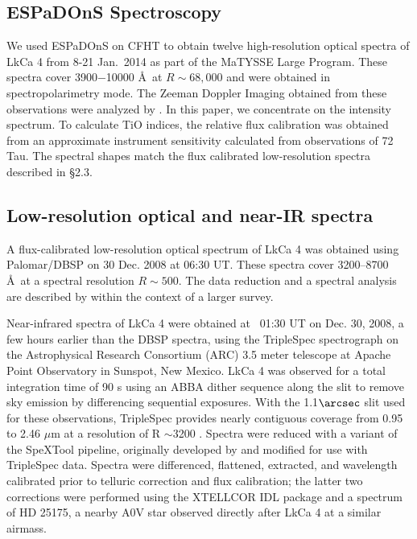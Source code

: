 \documentclass[twocolumn]{emulateapj}%
\newcommand{\name}{LkCa 4 }
\begin{document}
\subsection{ESPaDOnS Spectroscopy}
We used ESPaDOnS on CFHT to obtain twelve high-resolution optical spectra of \name from 8-21 Jan.~2014 as part of the MaTYSSE Large Program.  These spectra cover 3900$-$10000 \AA\ at $R\sim68,000$ and were obtained in spectropolarimetry mode.  The Zeeman Doppler Imaging obtained from these observations were analyzed by \citet{donati14}.  In this paper, we concentrate on the intensity spectrum.  To calculate TiO indices, the relative flux calibration was obtained from an approximate instrument sensitivity calculated from observations of 72 Tau.  The spectral shapes match the flux calibrated low-resolution spectra described in \S 2.3.


\subsection{Low-resolution optical and near-IR spectra}

A flux-calibrated low-resolution optical spectrum of LkCa 4 was obtained using Palomar/DBSP \citep[DBSP,][]{oke82} on 30 Dec. 2008 at 06:30 UT.  These spectra cover 3200--8700 \AA\ at a spectral resolution $R\sim 500$.  The data reduction and a spectral analysis are described by \citet{herczeg14} within the context of a larger survey.

Near-infrared spectra of LkCa 4 were obtained at ~01:30 UT on Dec. 30, 2008, a few hours earlier than the DBSP spectra, using the TripleSpec spectrograph on the Astrophysical Research Consortium (ARC) 3.5 meter telescope at Apache Point Observatory in Sunspot, New Mexico. LkCa 4 was observed for a total integration time of 90 s using an ABBA dither sequence along the slit to remove sky emission by differencing sequential exposures.  With the 1.1$\arcsec$ slit used for these observations, TripleSpec provides nearly contiguous coverage from 0.95 to 2.46 $\mu$m at a resolution of  R $\sim$3200 \citep{wilson04}. Spectra were reduced with a variant of the SpeXTool pipeline, originally developed by \citet{cushing04} and modified for use with TripleSpec data. Spectra were differenced, flattened, extracted, and wavelength calibrated prior to telluric correction and flux calibration; the latter two corrections were performed using the XTELLCOR IDL package \citep{vacca03} and a spectrum of HD 25175, a nearby A0V star observed directly after LkCa 4 at a similar airmass. 
\end{document}
